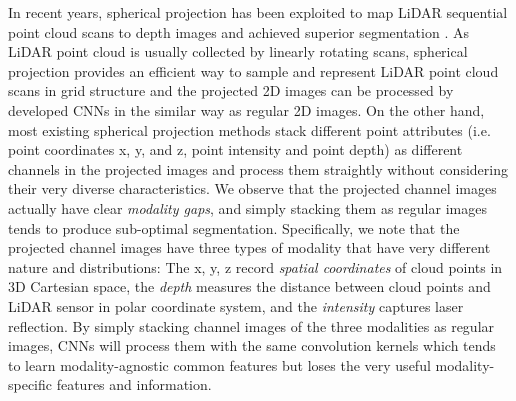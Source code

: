 \documentclass[preprint,review,3p]{elsarticle}
\begin{document}
In recent years, spherical projection has been exploited to map LiDAR sequential point cloud scans to depth images  and achieved superior segmentation \cite{wu2018squeezeseg,wu2019squeezesegv2,milioto2019rangenet++,shi2020spsequencenet}. As LiDAR point cloud is usually collected by linearly rotating scans, spherical projection provides an efficient way to sample and represent LiDAR point cloud scans in grid structure and the projected 2D images can be processed by developed CNNs in the similar way as regular 2D images. On the other hand, most existing spherical projection methods stack different point attributes (i.e. point coordinates x, y, and z, point intensity and point depth) as different channels in the projected images and process them straightly without considering their very diverse characteristics. We observe that the projected channel images actually have clear \textit{modality gaps}, and simply stacking them as regular images tends to produce sub-optimal segmentation. Specifically, we note that the projected channel images have three types of modality that have very different nature and distributions: The x, y, z record \textit{spatial coordinates} of cloud points in 3D Cartesian space, the \textit{depth} measures the distance between cloud points and LiDAR sensor in polar coordinate system, and the \textit{intensity} captures laser reflection. By simply stacking channel images of the three modalities as regular images, CNNs will process them with the same convolution kernels which tends to learn modality-agnostic common features but loses the very useful modality-specific features and information.
\end{document}
